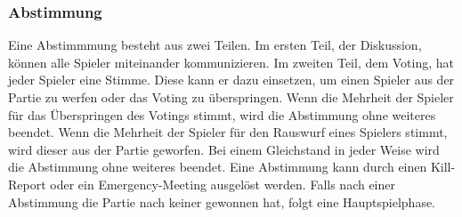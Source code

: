 \subsubsection{Abstimmung}
Eine Abstimmmung besteht aus zwei Teilen. Im ersten Teil, der Diskussion, können
alle Spieler miteinander kommunizieren. Im zweiten Teil, dem Voting, hat jeder
Spieler eine Stimme. Diese kann er dazu einsetzen, um einen Spieler aus der
Partie zu werfen oder das Voting zu überspringen. Wenn die Mehrheit der Spieler
für das Überspringen des Votings stimmt, wird die Abstimmung ohne weiteres
beendet. Wenn die Mehrheit der Spieler für den Rauswurf eines Spielers stimmt,
wird dieser aus der Partie geworfen. Bei einem Gleichstand in jeder Weise wird
die Abstimmung ohne weiteres beendet.
\newline
Eine Abstimmung kann durch einen Kill-Report oder ein Emergency-Meeting
ausgelöst werden. Falls nach einer Abstimmung die Partie nach keiner
gewonnen hat, folgt eine Hauptspielphase.
